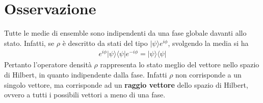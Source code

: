 \section{Osservazione} %
Tutte le medie di ensemble sono indipendenti da una fase globale davanti allo stato. Infatti, se  $\rho$ è descritto da stati del tipo $|\psi\rangle e^{i\phi}$, svolgendo la media si ha
\begin{equation}\begin{split}
e^{i\phi}|\psi\rangle \langle\psi|e^{-i\phi} = |\psi\rangle \langle\psi|
\end{split}\end{equation}
Pertanto l'operatore densità $\rho$ rappresenta lo stato meglio del vettore nello spazio di Hilbert, in quanto indipendente dalla fase. Infatti $\rho$ non corrisponde a un singolo vettore, ma corrisponde ad un \textbf{raggio vettore} dello spazio di Hilbert, ovvero a tutti i possibili vettori a meno di una fase.

